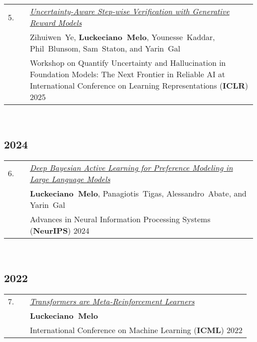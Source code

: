 \documentclass[11pt,letter,sans,colorlinks,linkcolor=true]{moderncv}
\begin{document}
\begin{minipage}{\textwidth}
\begin{tabular}{R{8mm}p{1mm}L{6.5in}}
 5.\hspace*{1mm} && \textit{\href{https://arxiv.org/abs/2502.11250}{Uncertainty-Aware Step-wise Verification with Generative Reward Models} }  \\
 && \mbox{Zihuiwen Ye}, \mbox{\textbf{Luckeciano Melo}}, \mbox{Younesse Kaddar}, \mbox{Phil Blunsom}, \mbox{Sam Staton}, and \mbox{Yarin Gal} \\
 && Workshop on Quantify Uncertainty and Hallucination in Foundation Models: The Next Frontier in Reliable AI at International Conference on Learning Representations (\textbf{ICLR}) 2025  \\
\end{tabular} \\[2mm]
\end{minipage}
\subsection{2024}

\begin{minipage}{\textwidth}
\begin{tabular}{R{8mm}p{1mm}L{6.5in}}
 6.\hspace*{1mm} && \textit{\href{https://arxiv.org/abs/2406.10023}{Deep Bayesian Active Learning for Preference Modeling in Large Language Models} }  \\
 && \mbox{\textbf{Luckeciano Melo}}, \mbox{Panagiotis Tigas}, \mbox{Alessandro Abate}, and \mbox{Yarin Gal} \\
 && Advances in Neural Information Processing Systems (\textbf{NeurIPS}) 2024  \\
\end{tabular} \\[2mm]
\end{minipage}
\subsection{2022}

\begin{minipage}{\textwidth}
\begin{tabular}{R{8mm}p{1mm}L{6.5in}}
 7.\hspace*{1mm} && \textit{\href{https://proceedings.mlr.press/v162/melo22a.html}{Transformers are Meta-Reinforcement Learners} }  \\
 && \mbox{\textbf{Luckeciano Melo}} \\
 && International Conference on Machine Learning (\textbf{ICML}) 2022  \\
\end{tabular} \\[2mm]
\end{minipage}
\end{document}
